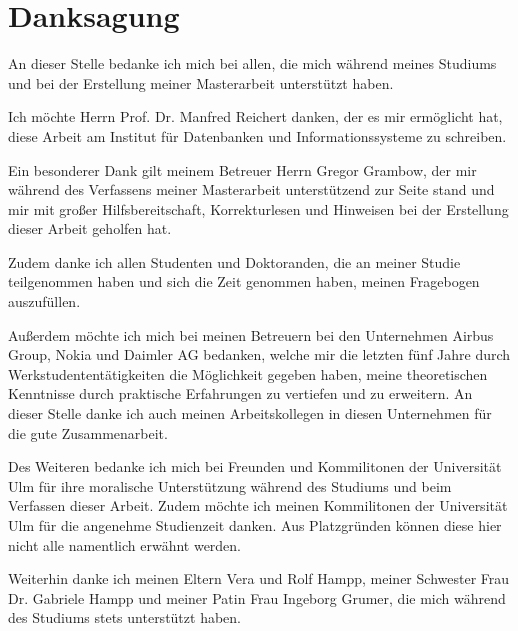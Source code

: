 \section*{Danksagung}

An dieser Stelle bedanke ich mich bei allen, die mich während meines Studiums und bei der Erstellung meiner Masterarbeit unterstützt haben.

Ich möchte Herrn Prof. Dr. Manfred Reichert danken, der es mir ermöglicht hat, diese Arbeit am Institut für Datenbanken und Informationssysteme zu schreiben.

Ein besonderer Dank gilt meinem Betreuer Herrn Gregor Grambow, der mir während des Verfassens meiner Masterarbeit unterstützend zur Seite stand und mir mit großer Hilfsbereitschaft, Korrekturlesen und Hinweisen bei der Erstellung dieser Arbeit geholfen hat.

Zudem danke ich allen Studenten und Doktoranden, die an meiner Studie teilgenommen haben und sich die Zeit genommen haben, meinen Fragebogen auszufüllen.

Außerdem möchte ich mich bei meinen Betreuern bei den Unternehmen Airbus Group, Nokia und Daimler AG bedanken, welche mir die letzten fünf Jahre durch Werkstudententätigkeiten die Möglichkeit gegeben haben, meine theoretischen Kenntnisse durch praktische Erfahrungen zu vertiefen und zu erweitern. 
An dieser Stelle danke ich auch meinen Arbeitskollegen in diesen Unternehmen für die gute Zusammenarbeit.

Des Weiteren bedanke ich mich bei Freunden und Kommilitonen der Universität Ulm für ihre moralische Unterstützung während des Studiums und beim Verfassen dieser Arbeit. Zudem möchte ich meinen Kommilitonen der Universität Ulm für die angenehme Studienzeit danken. Aus Platzgründen können diese hier nicht alle namentlich erwähnt werden.

Weiterhin danke ich meinen Eltern Vera und Rolf Hampp, meiner Schwester Frau Dr. Gabriele Hampp und meiner Patin Frau Ingeborg Grumer, die mich während des Studiums stets unterstützt haben.
